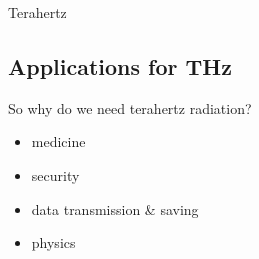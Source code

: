 \documentclass[aspectratio=1610, 9pt]{beamer}
\begin{document}
\begin{frame}{Terahertz}
  \subsection{Applications for THz}
  \begin{center}
    \begin{minipage}[c]{0.5\linewidth}
      So why do we need terahertz radiation?
      \vspace{0.2in}
      \begin{itemize}
        \item medicine \nocite{THzgap_applications}
        \vspace{0.1in}
        \item security \nocite{thz_explosive_detec}
        \vspace{0.1in}
        \item data transmission \& saving \nocite{communication,datasaving}
        \vspace{0.1in}
        \item physics \nocite{wiki_book}
      \end{itemize}
    \end{minipage}
\end{center}
\end{frame}
\end{document}
